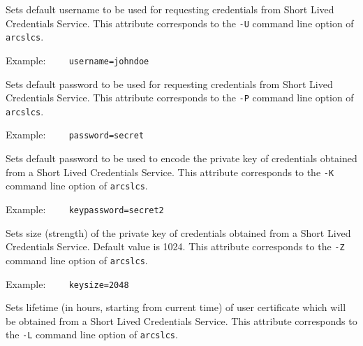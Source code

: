 Sets default username to be used for requesting credentials from Short Lived
Credentials Service. This attribute
corresponds to the \verb#-U# command line option of \texttt{arcslcs}.

Example:
\verb#    username=johndoe#

{}
\hspace*{0.5cm}
\begin{shaded}
\end{shaded}

Sets default password to be used for requesting credentials from Short Lived
Credentials Service. This attribute
corresponds to the \verb#-P# command line option of \texttt{arcslcs}.

Example:
\verb#    password=secret#

{}
\hspace*{0.5cm}
\begin{shaded}
\end{shaded}

Sets default password to be used to encode the private key of credentials obtained
from a Short Lived Credentials Service. This attribute
corresponds to the \verb#-K# command line option of \texttt{arcslcs}.

Example:
\verb#    keypassword=secret2#

{}
\hspace*{0.5cm}
\begin{shaded}
\end{shaded}

Sets size (strength) of the private key of credentials obtained from a Short
Lived Credentials Service. Default value is 1024. This attribute
corresponds to the \verb#-Z# command line option of \texttt{arcslcs}.

Example:
\verb#    keysize=2048#

{}
\hspace*{0.5cm}
\begin{shaded}
\end{shaded}

Sets lifetime (in hours, starting from current time) of user certificate which
will be obtained from a Short Lived Credentials Service. This attribute
corresponds to the \verb#-L# command line option of \texttt{arcslcs}.

